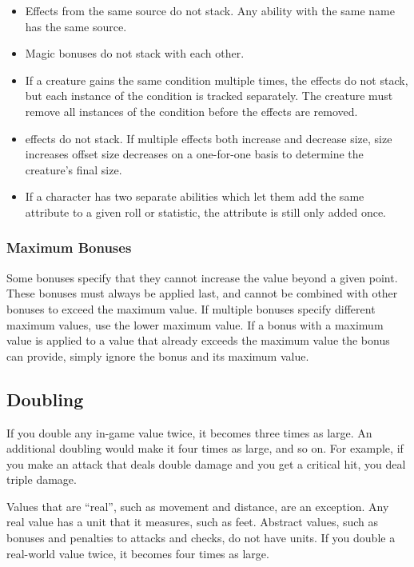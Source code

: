 
        \begin{itemize}
            \item Effects from the same source do not stack. Any ability with the same name has the same source.
            \item Magic bonuses do not stack with each other.
            \item If a creature gains the same condition multiple times, the effects do not stack, but each instance of the condition is tracked separately.
                The creature must remove all instances of the condition before the effects are removed.
            \item {} effects do not stack.
                If multiple effects both increase and decrease size, size increases offset size decreases on a one-for-one basis to determine the creature's final size.
            \item If a character has two separate abilities which let them add the same attribute to a given roll or statistic, the attribute is still only added once.
        \end{itemize}

        \subsubsection{Maximum Bonuses}\label{Ability Limits}
            Some bonuses specify that they cannot increase the value beyond a given point.
            These bonuses must always be applied last, and cannot be combined with other bonuses to exceed the maximum value.
            If multiple bonuses specify different maximum values, use the lower maximum value.
            If a bonus with a maximum value is applied to a value that already exceeds the maximum value the bonus can provide, simply ignore the bonus and its maximum value.

    \subsection{Doubling}\label{Doubling}
        If you double any in-game value twice, it becomes three times as large. An additional doubling would make it four times as large, and so on. For example, if you make an attack that deals double damage and you get a critical hit, you deal triple damage.

         Values that are ``real'', such as movement and distance, are an exception.
        Any real value has a unit that it measures, such as feet.
        Abstract values, such as bonuses and penalties to attacks and checks, do not have units.
        If you double a real-world value twice, it becomes four times as large.

